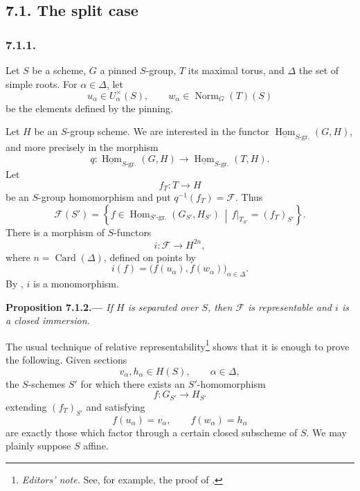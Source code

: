\subsection*{7.1. The split case}

\subsubsection*{7.1.1.}

Let \(S\) be a scheme, \(G\) a pinned \(S\)-group, \(T\) its maximal
torus, and \(\Delta\) the set of simple roots. For
\(\alpha\in\Delta\), let
\[
  u_\alpha\in U_\alpha^\times(S),
  \qquad
  w_\alpha\in\operatorname{Norm}_G(T)(S)
\]
be the elements defined by the pinning.

Let \(H\) be an \(S\)-group scheme. We are interested in the functor
\(\underline{\operatorname{Hom}}_{S\text{-}\mathrm{gr.}}(G,H)\), and
more precisely in the morphism
\[
  q:\underline{\operatorname{Hom}}_{S\text{-}\mathrm{gr.}}(G,H)
  \longrightarrow
  \underline{\operatorname{Hom}}_{S\text{-}\mathrm{gr.}}(T,H).
\]
Let
\[
  f_T:T\longrightarrow H
\]
be an \(S\)-group homomorphism and put \(q^{-1}(f_T)=\mathscr F\).
Thus
\[
  \mathscr F(S')
  =
  \left\{
    f\in\operatorname{Hom}_{S'\text{-}\mathrm{gr.}}
      (G_{S'},H_{S'})
    \,\middle|\,
    f|_{T_{S'}}=(f_T)_{S'}
  \right\}.
\]
There is a morphism of \(S\)-functors
\[
  i:\mathscr F\longrightarrow H^{2n},
\]
where \(n=\operatorname{Card}(\Delta)\), defined on points by
\[
  i(f)=\bigl(f(u_\alpha),f(w_\alpha)\bigr)_{\alpha\in\Delta}.
\]
By , \(i\) is a monomorphism.

\par\medskip\noindent{}\textbf{Proposition 7.1.2.---}\enspace
\emph{If \(H\) is separated over \(S\), then \(\mathscr F\) is
representable and \(i\) is a closed immersion.}

The usual technique of relative
representability\footnote{\textit{Editors' note.} See, for example, the
proof of .} shows that it is enough to prove the
following. Given sections
\[
  v_\alpha,h_\alpha\in H(S),
  \qquad \alpha\in\Delta,
\]
the \(S\)-schemes \(S'\) for which there exists an \(S'\)-homomorphism
\[
  f:G_{S'}\longrightarrow H_{S'}
\]
extending \((f_T)_{S'}\) and satisfying
\[
  f(u_\alpha)=v_\alpha,
  \qquad
  f(w_\alpha)=h_\alpha
\]
are exactly those which factor through a certain closed subscheme of
\(S\). We may plainly suppose \(S\) affine.

